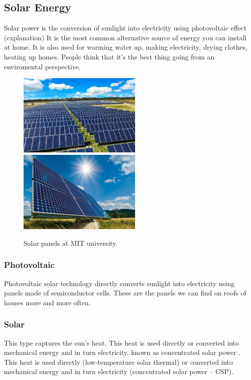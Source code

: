 \documentclass[11pt, titlepage]{article}
\begin{document}
	\subsection{Solar Energy}
		Solar power is the conversion of sunlight into electricity using photovoltaic effect (explanation)
		It is the most common alternative source of energy you can install at home.
		It is also used for warming water up, making electricity, drying clothes, heating up homes. People think that it's the best thing going from an enviromental perspective.
		\vspace{0.5cm}
		\begin{figure}[!h]
			\begin{center}
				\includegraphics[height=4cm]{img/solar_panels.jpg}
				\includegraphics[height=4cm]{img/solar_panels_2.jpg}
				\caption{Solar panels at MIT university.}
				\label{obr.graphicx}
			\end{center}
		\end{figure}

		\subsubsection{Photovoltaic}
			Photovoltaic solar technology directly converts sunlight into electricity using panels made of semiconductor cells. These are the panels we can find on roofs of houses more and more often.

		\subsubsection{Solar}
			This type captures the sun’s heat. This heat is used directly or converted into mechanical energy and in turn electricity, known as concentrated solar power . This heat is used directly (low‑temperature solar thermal) or converted into mechanical energy and in turn electricity (concentrated solar power – CSP).
\end{document}

